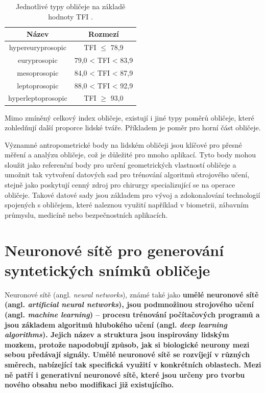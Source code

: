 \begin{table}[H]
    \centering
    \renewcommand{\arraystretch}{1.25}
    \begin{tabular}{|c|c|}
        \hline
        Název &  Rozmezí \\
        \hline
        hypereuryprosopic & TFI $\leq$ 78,9 \\
        euryprosopic & 79,0 < TFI < 83,9 \\
        mesoprosopic & 84,0 < TFI < 87,9 \\
        leptoprosopic & 88,0 < TFI < 92,9 \\
        hyperleptoprosopic & TFI $\geq$ 93,0 \\
        \hline
    \end{tabular}
    \caption{Jednotlivé typy obličeje na základě hodnoty TFI \cite{Jeremic2013}.}
    \label{tab:tfi-categories}
\end{table}

\noindent Mimo zmíněný celkový index obličeje, existují i jiné typy poměrů obličeje, které zohledňují další proporce lidské tváře. Příkladem je poměr pro horní část obličeje.

\bigskip

\noindent Významné antropometrické body na lidském obličeji jsou klíčové pro přesné měření a analýzu obličeje, což je důležité pro mnoho aplikací. Tyto body mohou sloužit jako referenční body pro určení geometrických vlastností obličeje a umožnit tak vytvoření datových sad pro trénování algoritmů strojového učení, stejně jako poskytují cenný zdroj pro chirurgy specializující se na operace obličeje. Takové datové sady jsou základem pro vývoj a zdokonalování technologií spojených s obličejem, které naleznou využití například v biometrii, zábavním průmyslu, medicíně nebo bezpečnostních aplikacích.

\chapter{Neuronové sítě pro generování syntetických snímků obličeje}
\label{neural}

Neuronové sítě (angl. \textit{neural networks}), známé také jako \bf umělé neuronové sítě \rm \cite{IBMANN} (angl. \textit{artificial neural networks}), jsou podmnožinou strojového učení (angl. \textit{machine learning}) -- procesu trénování počítačových programů a jsou základem algoritmů hlubokého učení (angl. \textit{deep learning algorithms}). Jejich název a struktura jsou inspirovány lidským mozkem, protože napodobují způsob, jak si biologické neurony mezi sebou předávají signály. Umělé neuronové sítě se rozvíjejí v různých směrech, nabízející tak specifická využití v konkrétních oblastech. Mezi ně patří i generativní neuronové sítě, které jsou určeny pro tvorbu nového obsahu nebo modifikaci již existujícího. 

